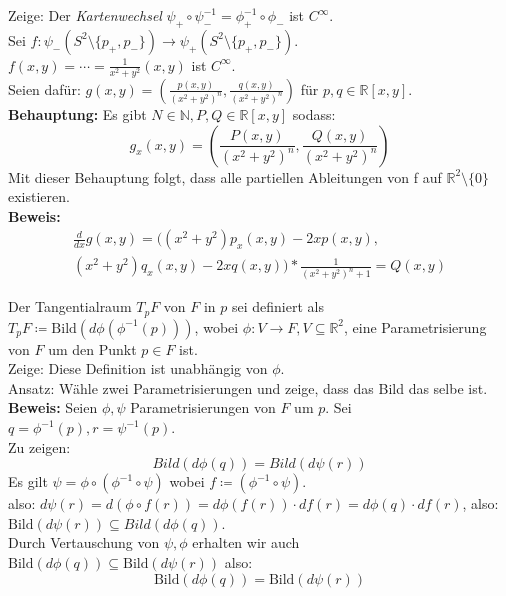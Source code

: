 \begin{problem}[1b]
  Zeige: Der \emph{Kartenwechsel} \( \psi_+ \circ \psi_-^{-1} = \phi_+^{-1} \circ \phi_- \) ist \( C^{\infty} \). \\
  Sei \( f: \psi_- (S^{2} \setminus \{ p_+, p_- \}) \to \psi_+(S^{2} \setminus \{ p_+, p_- \}) \). \\
  \( f(x,y) = \cdots = \frac{1}{x^2 + y^2}(x,y) \) ist \( C^{\infty} \). \\
  Seien dafür: \( g(x,y) = (\frac{p(x,y)}{{(x^2 + y^2)}^n}, \frac{q(x,y)}{{(x^2 + y^2)}^n}) \) für \( p,q \in \mathbb{R}[x,y] \). \\
  \textbf{Behauptung:} Es gibt \( N \in \mathbb{N}, P, Q \in \mathbb{R}[x,y] \) sodass:
  \begin{equation*}
    g_x(x,y) = \left(\frac{P(x,y)}{{(x^2 + y^2)}^n}, \frac{Q(x,y)}{{(x^2 + y^2)}^n} \right)
  \end{equation*}
  Mit dieser Behauptung folgt, dass alle partiellen Ableitungen von f auf \( \mathbb{R}^2 \setminus \{ 0 \} \) existieren. \\
  \textbf{Beweis:}
  \begin{align*}
    \frac{d}{dx} g(x,y) = ((x^2 + y^2) p_x(x,y) - 2x p(x,y), \\
    (x^2 + y^2) q_x(x,y) - 2x q(x,y))
    * \frac{1}{{(x^2 + y^2)}^n+1} = Q(x,y)
  \end{align*}
\end{problem}
\begin{problem}[2a]
  Der Tangentialraum \( T_p F \) von \( F \) in \( p \) sei definiert als \( T_p F \coloneqq \text{Bild}(d \phi (\phi^{-1}(p))) \), wobei \( \phi: V \to F, V \subseteq \mathbb{ R}^2 \), eine Parametrisierung von \( F \) um den Punkt \( p \in F \) ist. \\
  Zeige: Diese Definition ist unabhängig von \( \phi \). \\
  Ansatz: Wähle zwei Parametrisierungen und zeige, dass das Bild das selbe ist. \\
  \textbf{Beweis:} Seien \( \phi, \psi \) Parametrisierungen von \( F \) um \( p \). Sei \( q=\phi^{-1}(p), r=\psi^{-1}(p). \) \\
  Zu zeigen:
  \begin{equation*}
    Bild(d \phi(q)) = Bild(d \psi(r))
  \end{equation*}
  Es gilt \( \psi = \phi \circ (\phi^{-1} \circ \psi) \) wobei \( f \coloneqq (\phi^{-1} \circ \psi) \). \\
  also: \( d \psi(r) = d (\phi \circ f(r)) = d \phi(f(r)) \cdot df(r) = d \phi(q) \cdot df(r) \), also: \\
  \( \text{Bild}(d \psi(r)) \subseteq Bild(d\phi(q)) \). \\
  Durch Vertauschung von \( \psi ,\phi \) erhalten wir auch \( \text{Bild}(d\phi(q)) \subseteq \text{Bild}(d \psi(r)) \) also: 
  \begin{equation*}
    \text{Bild}(d\phi(q)) = \text{Bild}(d \psi(r))
  \end{equation*}
\end{problem}


